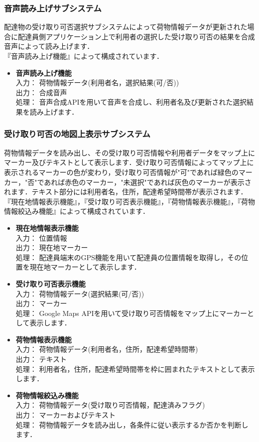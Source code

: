 \documentclass[a4j,titlepage]{jarticle}
\begin{document}
\subsubsection{音声読み上げサブシステム}
配達物の受け取り可否選択サブシステムによって荷物情報データが更新された場合に配達員側アプリケーション上で利用者の選択した受け取り可否の結果を合成音声によって読み上げます． \\
『音声読み上げ機能』によって構成されています．
\begin{itemize}
\item \textbf{音声読み上げ機能} \\
入力： 荷物情報データ(利用者名，選択結果(可/否)) \\
出力： 合成音声\\
処理： 音声合成APIを用いて音声を合成し、利用者名及び更新された選択結果を読み上げます．
\end{itemize}

\subsubsection{受け取り可否の地図上表示サブシステム}
荷物情報データを読み出し、その受け取り可否情報や利用者データをマップ上にマーカー及びテキストとして表示します．受け取り可否情報によってマップ上に表示されるマーカーの色が変わり，受け取り可否情報が"可"であれば緑色のマーカー，"否"であれば赤色のマーカー，"未選択"であれば灰色のマーカーが表示されます．テキスト部分には利用者名，住所，配達希望時間帯が表示されます． \\
『現在地情報表示機能』，『受け取り可否表示機能』，『荷物情報表示機能』，『荷物情報絞込み機能』によって構成されています．
\begin{itemize}

\item \textbf{現在地情報表示機能} \\
入力： 位置情報 \\
出力： 現在地マーカー \\
処理： 配達員端末のGPS機能を用いて配達員の位置情報を取得し，その位置を現在地マーカーとして表示します．
\item \textbf{受け取り可否表示機能} \\
入力： 荷物情報データ(選択結果(可/否)) \\
出力： マーカー \\
処理： Google Maps APIを用いて受け取り可否情報をマップ上にマーカーとして表示します．
\item \textbf{荷物情報表示機能} \\
入力： 荷物情報データ(利用者名，住所，配達希望時間帯) \\
出力： テキスト \\
処理： 利用者名，住所，配達希望時間帯を枠に囲まれたテキストとして表示します．
\item \textbf{荷物情報絞込み機能} \\
入力： 荷物情報データ(受け取り可否情報，配達済みフラグ) \\
出力： マーカーおよびテキスト \\
処理： 荷物情報データを読み出し，各条件に従い表示するか否かを判断します．
\end{itemize}
\end{document}
